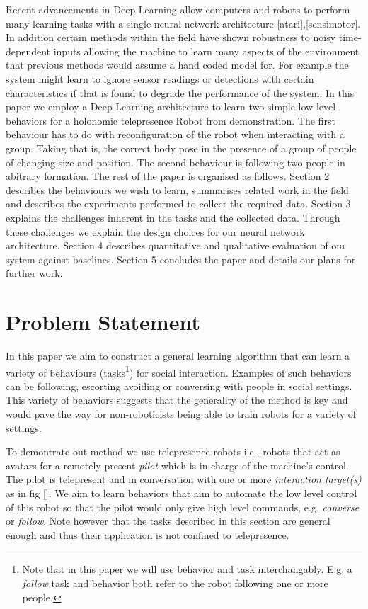 \documentclass[letterpaper, 10 pt, conference]{ieeeconf}
\begin{document}
 Recent advancements in Deep Learning allow computers and robots to perform many learning tasks with a single neural network architecture [atari],[sensimotor]. In addition certain methods within the field have shown robustness to noisy time-dependent inputs allowing the machine to learn many aspects of the environment that previous methods would assume a hand coded model for. For example the system might learn to ignore sensor readings or detections with certain characteristics if that is found to degrade the performance of the system. In this paper we employ a Deep Learning architecture to learn two simple low level behaviors for a holonomic telepresence Robot from demonstration. The first behaviour has to do with reconfiguration of the robot when interacting with a group. Taking that is, the correct body pose in the presence of a group of people of changing size and position. The second behaviour is following two people in abitrary formation. The rest of the paper is organised as follows. Section 2 describes the behaviours we wish to learn, summarises related work in the field and describes the experiments performed to collect the required data. Section 3 explains the challenges inherent in the tasks and the collected data. Through these challenges we explain the design choices for our neural network architecture. Section 4 describes quantitative and qualitative evaluation of our system against baselines. Section 5 concludes the paper and details our plans for further work.

\section{Problem Statement \label{sec:related_work}}

In this paper we aim to construct a general learning algorithm that can learn a variety of behaviours (tasks\footnote{Note that in this paper we will use behavior and task interchangably. E.g. a \emph{follow} task and behavior both refer to the robot following one or more people.}) for social interaction. Examples of such behaviors can be following, escorting avoiding or conversing with people in social settings. This variety of behaviors suggests that the generality of the method is key and would pave the way for non-roboticists being able to train robots for a variety of settings. 

To demontrate out method we use telepresence robots  i.e., robots that act as avatars for a remotely present \emph{pilot} which is in charge of the machine's control. The pilot is telepresent and in conversation with one or more \emph{interaction target(s)} as in fig []. We aim to learn behaviors  that aim to automate the low level control of this robot so that the pilot would only give high level commands, e.g, \emph{converse} or \emph{follow}. Note however that the tasks described in this section are general enough and thus their application is not confined to telepresence. 
\end{document}
